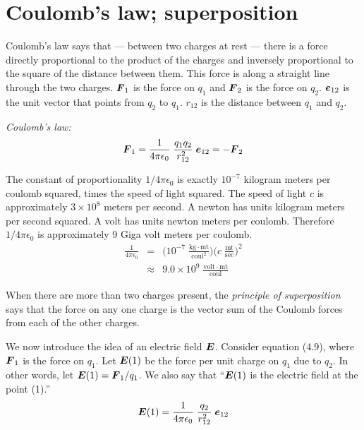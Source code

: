 \section{Coulomb's law; superposition}

Coulomb's law says that --- between two charges at rest ---
there is a force directly proportional to the product of the charges
and inversely proportional to the square of the distance between them.
This force is along a straight line through the two charges.
$\boldsymbol{F}_1$ is the force on $q_1$ and $\boldsymbol{F}_2$ is the force on $q_2$.
$\boldsymbol{e}_{12}$ is the unit vector that points from $q_2$ to $q_1$.
$r_{12}$ is the distance between $q_1$ and $q_2$.

\hspace{2em}\emph{Coulomb's law:}
\vspace{-0.5em}
\begin{equation}
  \boldsymbol{F}_1 = \frac{1}{4\pi\epsilon_0} \; \frac{q_1 q_2}{r^2_{12}} \; \boldsymbol{e}_{12} = - \boldsymbol{F}_2
\end{equation}

The constant of proportionality $1/4\pi\epsilon_0$ is exactly 
$10^{-7}$ kilogram meters per coulomb squared, times the speed of light squared.
The speed of light $c$ is approximately $3 \times 10^8$ meters per second.
A newton has units kilogram meters per second squared.
A volt has units newton meters per coulomb.
Therefore $1/4\pi\epsilon_0$ is approximately 9 Giga volt meters per coulomb.
\begin{eqnarray}
  \frac{1}{4\pi\epsilon_0} &=& 
  \Big( 10^{-7} \; \textstyle{\frac{\mathrm{kg} \cdot \mathrm{mt}}{\mathrm{coul}^2}} \Big)
  \Big( c \; \textstyle{\frac{\mathrm{mt}}{\mathrm{sec}}} \Big)^2 \nonumber\\
  &\approx& 9.0 \times 10^9 \; \textstyle{\frac{\mathrm{volt} \cdot \mathrm{mt}}{\mathrm{coul}}}
\end{eqnarray}

When there are more than two charges present,
the \emph{principle of superposition} says that the force on any one charge
is the vector sum of the Coulomb forces from each of the other charges.

We now introduce the idea of an electric field $\boldsymbol{E}$.
Consider equation (4.9), where $\boldsymbol{F}_1$ is the force on $q_1$.
Let $\boldsymbol{E}(1)$ be the force per unit charge on $q_1$ due to $q_2$.
In other words, let $\boldsymbol{E}(1) = \boldsymbol{F}_1 / q_1$.
We also say that ``$\boldsymbol{E}(1)$ is the electric field at the point (1).''
\begin{equation}
  \boldsymbol{E}(1) = \frac{1}{4\pi\epsilon_0} \; \frac{q_2}{r^2_{12}} \; \boldsymbol{e}_{12}
\end{equation}

